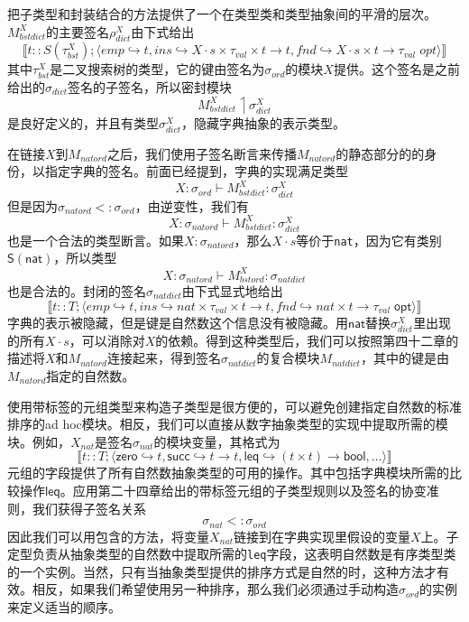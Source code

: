 把子类型和封装结合的方法提供了一个在类型类和类型抽象间的平滑的层次。$M_{bstdict}^X$的主要签名$\rho_{dict}^X$由下式给出$$\llbracket t::S(\tau_{bst}^X);\langle emp \hookrightarrow t ,ins \hookrightarrow X \cdot s \times \tau_{val} \times t \rightarrow t ,fnd \hookrightarrow X \cdot s \times t \rightarrow \tau_{val}\; opt \rangle \rrbracket$$其中$\tau_{bst}^X$是二叉搜索树的类型，它的键由签名为$\sigma_{ord}$的模块$X$提供。这个签名是之前给出的$\sigma_{dict}$签名的子签名，所以密封模块$$M_{bstdict}^X \upharpoonleft \sigma_{dict}^X$$是良好定义的，并且有类型$\sigma_{dict}^X$，隐藏字典抽象的表示类型。

在链接$X$到$M_{natord}$之后，我们使用子签名断言来传播$M_{natord}$的静态部分的的身份，以指定字典的签名。前面已经提到，字典的实现满足类型$$X:\sigma_{ord} \vdash M_{bstdict}^X : \sigma_{dict}^X$$但是因为$\sigma_{natord} <: \sigma_{ord}$，由逆变性，我们有$$X:\sigma_{natord} \vdash M_{bstdict}^X : \sigma_{dict}^X$$也是一个合法的类型断言。如果$X:\sigma_{natord}$，那么$X \cdot s$等价于\texttt{nat}，因为它有类别$\mathsf{S(nat)}$，所以类型$$X:\sigma_{natord} \vdash M_{bstord}^X:\sigma_{natdict}$$也是合法的。封闭的签名$\sigma_{natdict}$由下式显式地给出$$\llbracket t::T;\langle emp \hookrightarrow t ,ins \hookrightarrow nat \times \tau_{val} \times t \rightarrow t ,fnd \hookrightarrow nat \times t \rightarrow \tau_{val}\; \mathsf{opt} \rangle \rrbracket$$字典的表示被隐藏，但是键是自然数这个信息没有被隐藏。用$\mathsf{nat}$替换$\sigma_{dict}^X$里出现的所有$X \cdot s$，可以消除对$X$的依赖。得到这种类型后，我们可以按照第四十二章的描述将$X$和$M_{natord}$连接起来，得到签名$\sigma_{natdict}$的复合模块$M_{natdict}$，其中的键是由$M_{natord}$指定的自然数。

使用带标签的元组类型来构造子类型是很方便的，可以避免创建指定自然数的标准排序的ad hoc模块。相反，我们可以直接从数字抽象类型的实现中提取所需的模块。例如，$X_{nat}$是签名$\sigma_{nat}$的模块变量，其格式为$$\llbracket t::T;\langle \mathsf{zero} \hookrightarrow t, \mathsf{succ} \hookrightarrow t \rightarrow t, \mathsf{leq} \hookrightarrow (t \times t) \rightarrow \mathsf{bool}, ... \rangle \rrbracket$$元组的字段提供了所有自然数抽象类型的可用的操作。其中包括字典模块所需的比较操作$\mathsf{leq}$。应用第二十四章给出的带标签元组的子类型规则以及签名的协变准则，我们获得子签名关系$$\sigma_{nat} <: \sigma_{ord}$$因此我们可以用包含的方法，将变量$X_{nat}$链接到在字典实现里假设的变量$X$上。子定型负责从抽象类型的自然数中提取所需的\texttt{leq}字段，这表明自然数是有序类型类的一个实例。当然，只有当抽象类型提供的排序方式是自然的时，这种方法才有效。相反，如果我们希望使用另一种排序，那么我们必须通过手动构造$\sigma_{ord}$的实例来定义适当的顺序。


